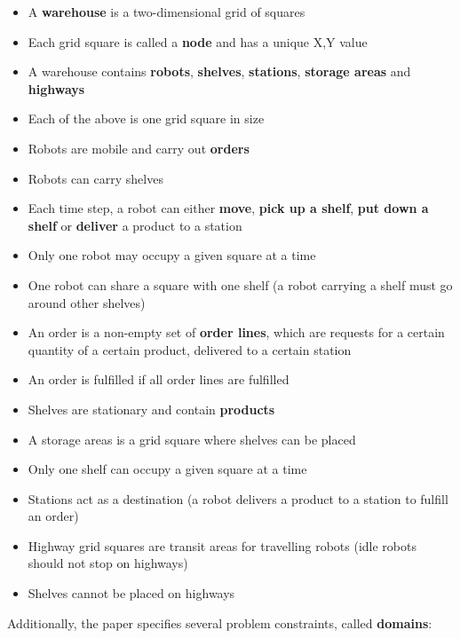 \documentclass[12pt]{article}
\begin{document}
\begin{itemize}[noitemsep]
\item	A \textbf{warehouse} is a two-dimensional grid of squares
\item	Each grid square is called a \textbf{node} and has a unique X,Y value
\item	A warehouse contains \textbf{robots}, \textbf{shelves}, \textbf{stations}, \textbf{storage areas} and \textbf{highways}
\item	Each of the above is one grid square in size
\item	Robots are mobile and carry out \textbf{orders}
\item	Robots can carry shelves
\item	Each time step, a robot can either \textbf{move}, \textbf{pick up a shelf}, \textbf{put down a shelf} or \textbf{deliver} a product to a station
\item	Only one robot may occupy a given square at a time
\item	One robot can share a square with one shelf (a robot carrying a shelf must go around other shelves)
\item	An order is a non-empty set of \textbf{order lines}, which are requests for a certain quantity of a certain product, delivered to a certain station 
\item	An order is fulfilled if all order lines are fulfilled
\item	Shelves are stationary and contain \textbf{products}
\item	A storage areas is a grid square where shelves can be placed
\item	Only one shelf can occupy a given square at a time
\item	Stations act as a destination (a robot delivers a product to a station to fulfill an order)
\item	Highway grid squares are transit areas for travelling robots (idle robots should not stop on highways)
\item	Shelves cannot be placed on highways
\end{itemize}

Additionally, the paper specifies several problem constraints, called \textbf{domains}:
\end{document}
